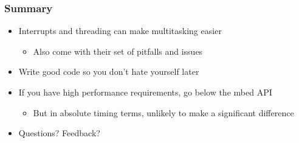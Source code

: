 \documentclass{beamer}
\begin{document}
\begin{frame}
\frametitle{Summary}
\begin{itemize}
  \item Interrupts and threading can make multitasking easier
  \begin{itemize}
    \item Also come with their set of pitfalls and issues
  \end{itemize}
  \item Write good code so you don't hate yourself later
  \item If you have high performance requirements, go below the mbed API
  \begin{itemize}
    \item But in absolute timing terms, unlikely to make a significant difference
  \end{itemize}
  \vspace{20px}
  \item Questions? Feedback?
\end{itemize}
\end{frame}
\end{document}
